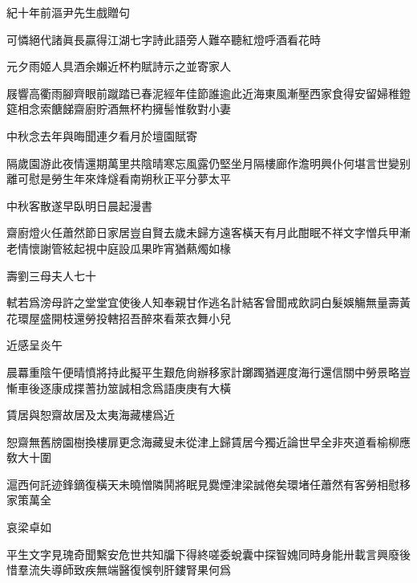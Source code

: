 \documentclass{zhvt-classic-Miya}
\begin{document}
\begin{fw}紀十年前漚尹先生戲贈句\end{fw}

可憐絕代諸眞長贏得江湖七字詩此語旁人難卒聽紅燈呼酒看花時

\begin{fw}元夕雨姬人具酒余嬾近杯杓賦詩示之並寄家人\end{fw}

屐響高衢雨腳齊眼前蹴踏已春泥經年佳節誰逾此近海東風漸壓西家食得安留婦稚鐙筵相念索餹䬾齋廚貯酒無杯杓擁髻惟敎對小妻

\begin{fw}中秋念去年與晦聞連夕看月於壇園賦寄\end{fw}

隔歲園游此夜情還期萬里共陰晴寒忘風露仍堅坐月隔樓廊作澹明興仆何堪言世變别離可慰是勞生年來烽燧看南朔秋正平分夢太平

\begin{fw}中秋客散遂早臥明日晨起漫書\end{fw}

齋廚燈火任蕭然節日家居豈自賢去歲未歸方遠客橫天有月此酣眠不祥文字憎兵甲漸老情懷謝管絃起視中庭設瓜果昨宵猶爇燭如椽

\begin{fw}壽劉三母夫人七十\end{fw}

軾若爲滂母許之堂堂宜使後人知奉親甘作逃名計結客曾聞戒飲詞白髮娛觴無量壽黃花環屋盛開枝還勞投轄招吾醉來看萊衣舞小兒

\begin{fw}近感呈炎午\end{fw}

晨羃重陰午便晴憤將持此擬平生艱危尙辦移家計躑躅猶遲度海行還信關中勞景略豈慚車後逐康成揲蓍扐筮誠相念爲語庚庚有大橫

\begin{fw}賃居與恕齋故居及太夷海藏樓爲近\end{fw}

恕齋無舊牓園樹換樓扉更念海藏叟未從津上歸賃居今獨近論世早全非夾道看榆柳應敎大十圍

滬西何託迹鋒鏑復橫天未曉憎隣鬨將眠見爨煙津梁誠倦矣環堵任蕭然有客勞相慰移家策萬全

\begin{fw}哀梁卓如\end{fw}

平生文字見瑰奇聞繫安危世共知牖下得終嗟委蛻囊中探智媿同時身能卅載言興廢後惜羣流失導師致疾無端醫復悞刳肝鏤腎果何爲
\end{document}
